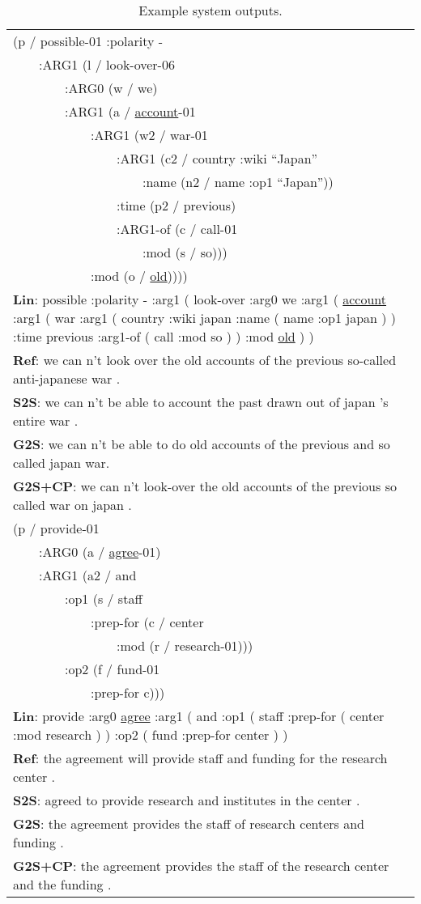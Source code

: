 \documentclass[11pt,a4paper]{article}
\begin{document}
\begin{table}[t!] \small
\centering
\begin{tabularx}{0.5\textwidth}{X}
\hline
(p / possible-01 :polarity - \\
~~~~:ARG1 (l / look-over-06 \\
~~~~~~~~:ARG0 (w / we) \\
~~~~~~~~:ARG1 (a / \underline{account}-01 \\
~~~~~~~~~~~~:ARG1 (w2 / war-01 \\
~~~~~~~~~~~~~~~~:ARG1 (c2 / country :wiki ``Japan'' \\
~~~~~~~~~~~~~~~~~~~~:name (n2 / name :op1 ``Japan'')) \\
~~~~~~~~~~~~~~~~:time (p2 / previous) \\
~~~~~~~~~~~~~~~~:ARG1-of (c / call-01 \\
~~~~~~~~~~~~~~~~~~~~:mod (s / so))) \\
~~~~~~~~~~~~:mod (o / \underline{old})))) \\
\textbf{Lin}: possible :polarity - :arg1 ( look-over :arg0 we :arg1 ( \underline{account} :arg1 ( war :arg1 ( country :wiki japan :name ( name :op1 japan ) ) :time previous :arg1-of ( call :mod so ) ) :mod \underline{old} ) ) \\
\textbf{Ref}: we can n't look over the old accounts of the previous so-called anti-japanese war . \\
\textbf{S2S}: we can n't be able to account the past drawn out of japan 's entire war .\\
\textbf{G2S}: we can n't be able to do old accounts of the previous and so called japan war.\\
\textbf{G2S+CP}: we can n't look-over the old accounts of the previous so called war on japan . \\
\hline
(p / provide-01 \\
~~~~:ARG0 (a / \underline{agree}-01) \\
~~~~:ARG1 (a2 / and \\
~~~~~~~~:op1 (s / staff \\
~~~~~~~~~~~~:prep-for (c / center \\
~~~~~~~~~~~~~~~~:mod (r / research-01))) \\
~~~~~~~~:op2 (f / fund-01 \\
~~~~~~~~~~~~:prep-for c))) \\
\textbf{Lin}: provide :arg0 \underline{agree} :arg1 ( and :op1 ( staff :prep-for ( center :mod research ) ) :op2 ( fund :prep-for center ) ) \\
\textbf{Ref}: the agreement will provide staff and funding for the research center .\\
\textbf{S2S}: agreed to provide research and institutes in the center .\\
\textbf{G2S}: the agreement provides the staff of research centers and funding . \\
\textbf{G2S+CP}: the agreement provides the staff of the research center and the funding .\\
\hline
\end{tabularx}
\caption{Example system outputs.}
\label{tab:examples}
\end{table}
\end{document}
